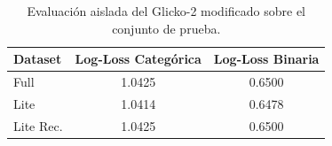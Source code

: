 \begin{table}[htbp]
    \centering
    \caption{Evaluaci\'on aislada del Glicko-2 modificado sobre el conjunto de prueba.}
    \label{tab:glicko_aislado}
    \begin{tabular}{lcc}
        \toprule
        \textbf{Dataset} & \textbf{Log-Loss Categ\'orica} & \textbf{Log-Loss Binaria} \\
        \midrule
        Full & 1.0425 & 0.6500 \\
        Lite & 1.0414 & 0.6478 \\
        Lite Rec. & 1.0425 & 0.6500 \\
        \bottomrule
    \end{tabular}
\end{table}